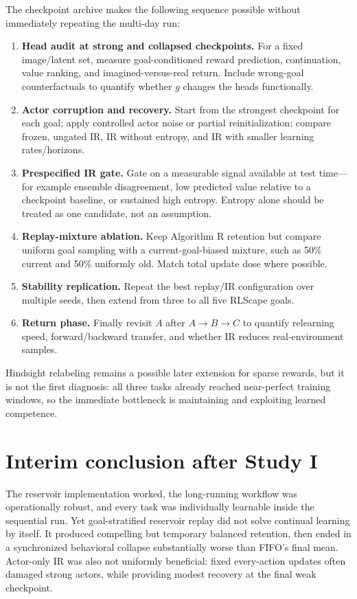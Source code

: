 \documentclass[10pt]{article}
\begin{document}
The checkpoint archive makes the following sequence possible without immediately repeating the multi-day run:

\begin{enumerate}
  \item \textbf{Head audit at strong and collapsed checkpoints.} For a fixed image/latent set, measure goal-conditioned reward prediction, continuation, value ranking, and imagined-versus-real return. Include wrong-goal counterfactuals to quantify whether $g$ changes the heads functionally.
  \item \textbf{Actor corruption and recovery.} Start from the strongest checkpoint for each goal; apply controlled actor noise or partial reinitialization; compare frozen, ungated IR, IR without entropy, and IR with smaller learning rates/horizons.
  \item \textbf{Prespecified IR gate.} Gate on a measurable signal available at test time---for example ensemble disagreement, low predicted value relative to a checkpoint baseline, or sustained high entropy. Entropy alone should be treated as one candidate, not an assumption.
  \item \textbf{Replay-mixture ablation.} Keep Algorithm R retention but compare uniform goal sampling with a current-goal-biased mixture, such as 50\% current and 50\% uniformly old. Match total update dose where possible.
  \item \textbf{Stability replication.} Repeat the best replay/IR configuration over multiple seeds, then extend from three to all five RLScape goals.
  \item \textbf{Return phase.} Finally revisit $A$ after $A\rightarrow B\rightarrow C$ to quantify relearning speed, forward/backward transfer, and whether IR reduces real-environment samples.
\end{enumerate}

Hindsight relabeling remains a possible later extension for sparse rewards, but it is not the first diagnosis: all three tasks already reached near-perfect training windows, so the immediate bottleneck is maintaining and exploiting learned competence.

\section{Interim conclusion after Study I}

The reservoir implementation worked, the long-running workflow was operationally robust, and every task was individually learnable inside the sequential run. Yet goal-stratified reservoir replay did not solve continual learning by itself. It produced compelling but temporary balanced retention, then ended in a synchronized behavioral collapse substantially worse than FIFO's final mean. Actor-only IR was also not uniformly beneficial: fixed every-action updates often damaged strong actors, while providing modest recovery at the final weak checkpoint.
\end{document}
